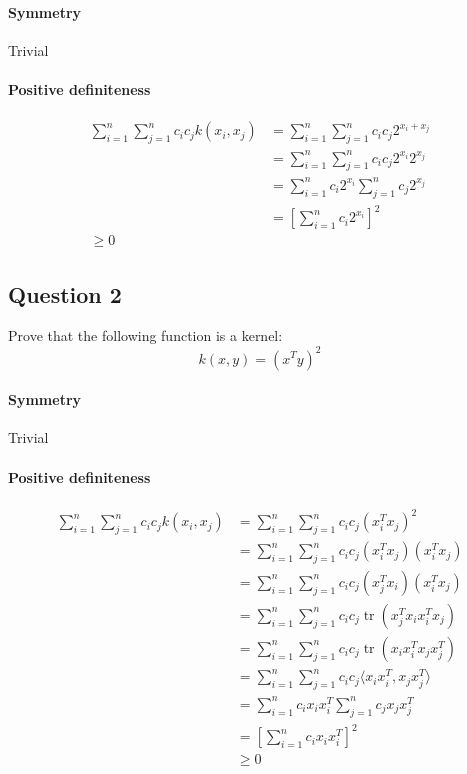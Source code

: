 \documentclass{article}
\newcommand{\1}{\mathbf{1}}
\begin{document}
\paragraph{Symmetry} Trivial
\paragraph{Positive definiteness}
\begin{align*}
  \sum_{i=1}^n \sum_{j=1}^n c_i c_j k(x_i, x_j)
   & = \sum_{i=1}^n \sum_{j=1}^n c_i c_j 2^{x_i + x_j}   \\
   & = \sum_{i=1}^n \sum_{j=1}^n c_i c_j 2^{x_i} 2^{x_j} \\
   & = \sum_{i=1}^n c_i 2^{x_i} \sum_{j=1}^n c_j 2^{x_j} \\
   & = \left[\sum_{i=1}^n c_i 2^{x_i}\right]^2           \\
  \geq 0
\end{align*}

\subsection{Question 2}
Prove that the following function is a kernel:
\begin{equation*}
  k(x,y) = (x^T y)^2
\end{equation*}
\paragraph{Symmetry} Trivial

\paragraph{Positive definiteness}
\begin{align*}
  \sum_{i=1}^n \sum_{j=1}^n c_i c_j k(x_i, x_j)
   & = \sum_{i=1}^n \sum_{j=1}^n c_i c_j (x_i^T x_j)^2                           \\
   & = \sum_{i=1}^n \sum_{j=1}^n c_i c_j (x_i^T x_j) (x_i^T x_j)                 \\
   & = \sum_{i=1}^n \sum_{j=1}^n c_i c_j (x_j^T x_i) (x_i^T x_j)                 \\
   & = \sum_{i=1}^n \sum_{j=1}^n c_i c_j \operatorname{tr} (x_j^T x_i x_i^T x_j) \\
   & = \sum_{i=1}^n \sum_{j=1}^n c_i c_j \operatorname{tr} (x_i x_i^T x_j x_j^T) \\
   & = \sum_{i=1}^n \sum_{j=1}^n c_i c_j \langle x_i x_i^T, x_j x_j^T \rangle    \\
   & = \sum_{i=1}^n c_i x_i x_i^T \sum_{j=1}^n c_j x_j x_j^T                     \\
   & = \left[\sum_{i=1}^n c_i x_i x_i^T\right]^2                                 \\
   & \geq 0
\end{align*}
\end{document}
